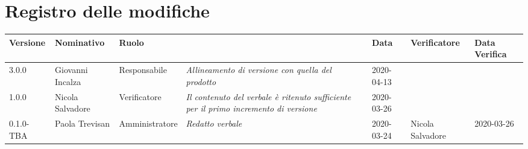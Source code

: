 \section*{Registro delle modifiche}
\renewcommand{\arraystretch}{1.8}

  \setlength\LTleft{-1.7cm}
  \begin{longtable}{|p{1.7cm}|p{2cm}|p{2.5cm}|p{3cm}|p{1.7cm}|p{2cm}|p{2.3cm}|}
    \hline

    \rowcolor{header}
    \textbf{Versione} & \textbf{Nominativo} & \textbf{Ruolo} & \centering{\textbf{Descrizione}} & \textbf{Data} & \textbf{Verificatore} & \textbf{Data Verifica}\\

    \hline
    3.0.0 & Giovanni Incalza & Responsabile & \small{\textit{Allineamento di versione con quella del prodotto}} & 2020-04-13 & &\\
    1.0.0 & Nicola Salvadore & Verificatore & \small{\textit{Il contenuto del verbale è ritenuto sufficiente per il primo incremento di versione}} & 2020-03-26 & &\\
	0.1.0-TBA & Paola Trevisan & Amministratore & \small{\textit{Redatto verbale}} & 2020-03-24 & Nicola Salvadore & 2020-03-26 \\
    \hline
  \end{longtable}
  \setlength\LTleft{0cm}
